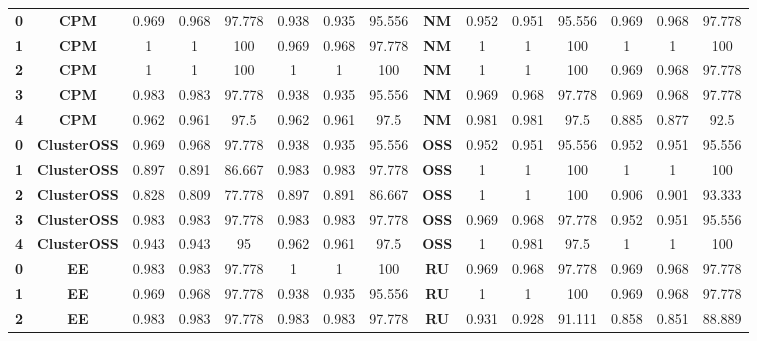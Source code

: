 {{\begin{tabular}{c|c|cccccc|ccccccc}
\textbf{0} & \textbf{CPM} & 0.969 & 0.968 & 97.778 & 0.938 & 0.935 & 95.556 & \multicolumn{1}{c|}{\textbf{NM}} & 0.952 & 0.951 & 95.556 & 0.969 & 0.968 & 97.778 \\
\textbf{1} & \textbf{CPM} & 1     & 1     & 100   & 0.969 & 0.968 & 97.778 & \multicolumn{1}{c|}{\textbf{NM}} & 1     & 1     & 100   & 1     & 1     & 100 \\
\textbf{2} & \textbf{CPM} & 1     & 1     & 100   & 1     & 1     & 100   & \multicolumn{1}{c|}{\textbf{NM}} & 1     & 1     & 100   & 0.969 & 0.968 & 97.778 \\
\textbf{3} & \textbf{CPM} & 0.983 & 0.983 & 97.778 & 0.938 & 0.935 & 95.556 & \multicolumn{1}{c|}{\textbf{NM}} & 0.969 & 0.968 & 97.778 & 0.969 & 0.968 & 97.778 \\
\textbf{4} & \textbf{CPM} & 0.962 & 0.961 & 97.5  & 0.962 & 0.961 & 97.5  & \multicolumn{1}{c|}{\textbf{NM}} & 0.981 & 0.981 & 97.5  & 0.885 & 0.877 & 92.5 \\
\textbf{0} & \textbf{ClusterOSS} & 0.969 & 0.968 & 97.778 & 0.938 & 0.935 & 95.556 & \multicolumn{1}{c|}{\textbf{OSS}} & 0.952 & 0.951 & 95.556 & 0.952 & 0.951 & 95.556 \\
\textbf{1} & \textbf{ClusterOSS} & 0.897 & 0.891 & 86.667 & 0.983 & 0.983 & 97.778 & \multicolumn{1}{c|}{\textbf{OSS}} & 1     & 1     & 100   & 1     & 1     & 100 \\
\textbf{2} & \textbf{ClusterOSS} & 0.828 & 0.809 & 77.778 & 0.897 & 0.891 & 86.667 & \multicolumn{1}{c|}{\textbf{OSS}} & 1     & 1     & 100   & 0.906 & 0.901 & 93.333 \\
\textbf{3} & \textbf{ClusterOSS} & 0.983 & 0.983 & 97.778 & 0.983 & 0.983 & 97.778 & \multicolumn{1}{c|}{\textbf{OSS}} & 0.969 & 0.968 & 97.778 & 0.952 & 0.951 & 95.556 \\
\textbf{4} & \textbf{ClusterOSS} & 0.943 & 0.943 & 95    & 0.962 & 0.961 & 97.5  & \multicolumn{1}{c|}{\textbf{OSS}} & 1     & 0.981 & 97.5  & 1     & 1     & 100 \\
\textbf{0} & \textbf{EE} & 0.983 & 0.983 & 97.778 & 1     & 1     & 100   & \multicolumn{1}{c|}{\textbf{RU}} & 0.969 & 0.968 & 97.778 & 0.969 & 0.968 & 97.778 \\
\textbf{1} & \textbf{EE} & 0.969 & 0.968 & 97.778 & 0.938 & 0.935 & 95.556 & \multicolumn{1}{c|}{\textbf{RU}} & 1     & 1     & 100   & 0.969 & 0.968 & 97.778 \\
\textbf{2} & \textbf{EE} & 0.983 & 0.983 & 97.778 & 0.983 & 0.983 & 97.778 & \multicolumn{1}{c|}{\textbf{RU}} & 0.931 & 0.928 & 91.111 & 0.858 & 0.851 & 88.889 \\

\end{tabular}}}
